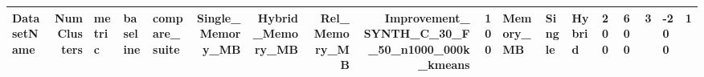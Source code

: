 \begin{tabular}{lrlllrrrrr}
\toprule
DatasetName & NumClusters & metric & baseline & compare_suite & Single_Memory_MB & Hybrid_Memory_MB & Rel_Memory_MB & Improvement_%
\midrule
SYNTH_C_30_F_50_n1000_000k_kmeans & 100 & Memory_MB & Single & Hybrid & 200 & 600 & 3 & -200 & 1 \\
\bottomrule
\end{tabular}
